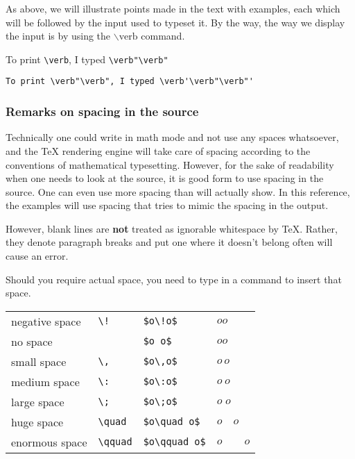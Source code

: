 \bigskip

As above, we will illustrate points made in the text with examples, each which will be followed by the input used to typeset it.  By the way, the way we display the input is by using the $\backslash\mathrm{verb}$ command.

\medskip

To print \verb"\verb", I typed \verb'\verb"\verb"'

\smallskip

\verb?To print \verb"\verb", I typed \verb'\verb"\verb"'?


\subsubsection{Remarks on spacing in the source}

Technically one could write in math mode and not use any spaces whatsoever, and the \TeX{} rendering engine will take care of spacing according to the conventions of mathematical typesetting. However, for the sake of readability when one needs to look at the source, it is good form to use spacing in the source. One can even use more spacing than will actually show. In this reference, the examples will use spacing that tries to mimic the spacing in the output.

However, blank lines are \textbf{not} treated as ignorable whitespace by \TeX.  Rather, they denote paragraph breaks and put one where it doesn't belong often will cause an error. 

Should you require actual space, you need to type in a command to insert that space.

\medskip

\begin{tabular}{l l l l}
negative space  & \verb"\!" & \verb"$o\!o$"  & $o\!o$ \\
no space  &  & \verb"$o o$"  & $o o$ \\
small space & \verb"\," & \verb"$o\,o$"  & $o\,o$ \\
medium space & \verb"\:" & \verb"$o\:o$"  & $o\:o$ \\
large space & \verb"\;" & \verb"$o\;o$"  & $o\;o$ \\
huge space & \verb"\quad" & \verb"$o\quad o$"  & $o\quad o$ \\
enormous space & \verb"\qquad" & \verb"$o\qquad o$"  & $o\qquad o$ \\
\end{tabular}

\medskip

